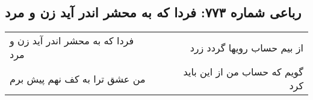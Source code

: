 \begin{center}
\section*{رباعی شماره ۷۷۳: فردا که به محشر اندر آید زن و مرد}
\label{sec:0773}
\begin{longtable}{l p{0.5cm} r}
فردا که به محشر اندر آید زن و مرد
&&
از بیم حساب رویها گردد زرد
\\
من عشق ترا به کف نهم پیش برم
&&
گویم که حساب من از این باید کرد
\\
\end{longtable}
\end{center}
